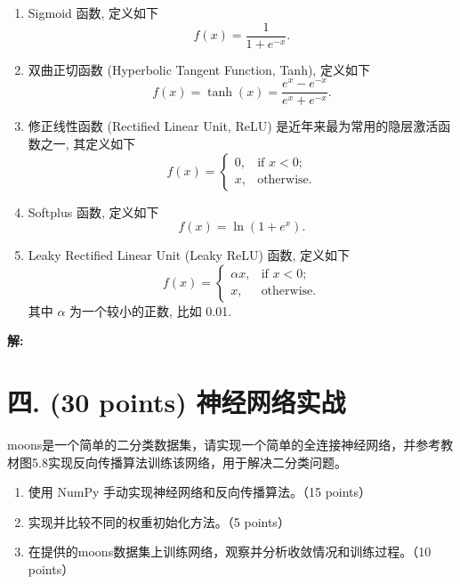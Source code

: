 \documentclass[8pt]{article}
\begin{document}
\begin{enumerate}
    \item Sigmoid 函数, 定义如下
    \begin{equation}
        f(x) = \frac{1}{1 + e^{-x}}.
        \label{eq:sigmoid}
    \end{equation}
    \item 双曲正切函数 (Hyperbolic Tangent Function, Tanh), 定义如下
    \begin{equation}
        f(x) = \tanh(x) = \frac{e^x - e^{-x}}{e^x + e^{-x}}.
        \label{eq:tanh}
    \end{equation}

    \item 修正线性函数 (Rectified Linear Unit, ReLU) 是近年来最为常用的隐层激活函数之一, 其定义如下
    \begin{equation}
        f(x) = \begin{cases}
            0, & \text{if } x < 0; \\
            x, & \text{otherwise}.
        \end{cases}
        \label{eq:relu}
    \end{equation}

    \item Softplus 函数, 定义如下
    \begin{equation}
        f(x) = \ln(1 + e^x).
        \label{eq:softplus}
    \end{equation}

    \item Leaky Rectified Linear Unit (Leaky ReLU) 函数, 定义如下
    \begin{equation}
        f(x) = \begin{cases}
            \alpha x, & \text{if } x < 0; \\
            x, & \text{otherwise}.
        \end{cases}
        \label{eq:leaky_relu}
    \end{equation}
    其中 $\alpha$ 为一个较小的正数, 比如 0.01.
\end{enumerate}

\textbf{\large 解:}

\vspace{3em}

\section*{四. (30 points) 神经网络实战}
moons是一个简单的二分类数据集，请实现一个简单的全连接神经网络，并参考教材图5.8实现反向传播算法训练该网络，用于解决二分类问题。
\begin{enumerate}
    \item 使用 NumPy 手动实现神经网络和反向传播算法。（15 points）
    \item 实现并比较不同的权重初始化方法。（5 points）
    \item 在提供的moons数据集上训练网络，观察并分析收敛情况和训练过程。（10 points）
\end{enumerate}
\end{document}
